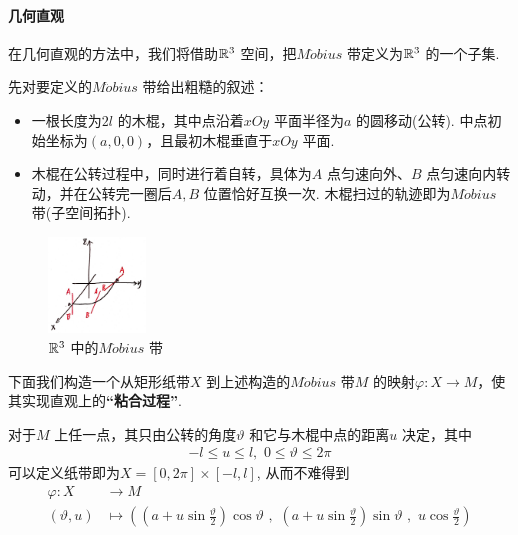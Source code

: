  \vspace{2em}
 \paragraph{几何直观}
 	在几何直观的方法中，我们将借助$\mathbb{R}^3$ 空间，把$M\ddot{o}bius$ 带定义为$\mathbb{R}^3$ 的一个子集.
 	
 	\vspace{2em}
 	先对要定义的$M\ddot{o}bius$ 带给出粗糙的叙述：
 	\begin{itemize}
 		\item 一根长度为$2l$ 的木棍，其中点沿着$xOy$ 平面半径为$a$ 的圆移动(公转). 中点初始坐标为$(a , 0 , 0)$，且最初木棍垂直于$xOy$ 平面.
 		
 		\item 木棍在公转过程中，同时进行着自转，具体为$A$ 点匀速向外、$B$ 点匀速向内转动，并在公转完一圈后$A , B$ 位置恰好互换一次. 木棍扫过的轨迹即为$M\ddot{o}bius$ 带(子空间拓扑).
 	\end{itemize}
 	
 	\begin{figure}[htbp]  %
 		\centering  %
 		\includegraphics[width=0.23\textwidth]{figure/3.1.1-1} %
 		\caption{$\mathbb{R}^3$ 中的$M\ddot{o}bius$ 带} %
 		\label{pic 3.1.1-1}
 	\end{figure}
 
 	\newpage
 	下面我们构造一个从矩形纸带$X$ 到上述构造的$M\ddot{o}bius$ 带$M$ 的映射$\varphi : X \longrightarrow M$，使其实现直观上的\textbf{“粘合过程”}.
 	
 	\vspace{2em}
 	对于$M$ 上任一点，其只由公转的角度$\vartheta$ 和它与木棍中点的距离$u$ 决定，其中
 	\begin{align}
 		-l \leq u \leq l , \,\, 0 \leq \vartheta \leq 2\pi
 	\end{align}
	可以定义纸带即为$X = [0 , 2\pi] \times [-l , l]$, 从而不难得到
	\begin{align}
		\varphi : X &\longrightarrow M \\
		(\vartheta , u) &\longmapsto \left( (a + u\sin{\frac{\vartheta}{2}}) \cos{\vartheta} \,\, , \,\, (a + u\sin{\frac{\vartheta}{2}}) \sin{\vartheta} \,\, , \,\, u\cos{\frac{\vartheta}{2}} \right)
	\end{align}

